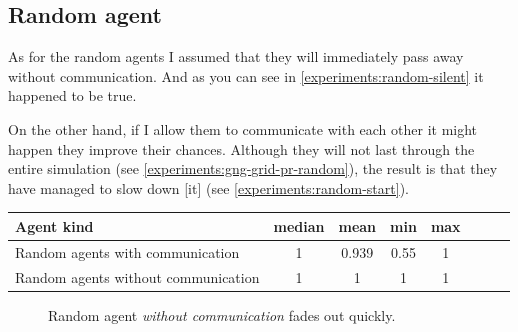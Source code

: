 \clearpage

\subsection{Random agent}   

As for the random agents I assumed that they will immediately pass away without communication. And as you can see in \ref{experiments:random-silent} it happened to be true. 

On the other hand, if I allow them to communicate with each other it might happen they improve their chances. Although they will not last through the entire simulation (see \ref{experiments:gng-grid-pr-random}), the result is that they have managed to slow down [it] (see \ref{experiments:random-start}).

\begin{center}   
  \begin{tabular}{l*{6}{c}r}
  Agent kind        & median & mean & min & max \\
  \hline  
  Random agents with communication     & 1 & 0.939 & 0.55 & 1  \\
  Random agents without communication    & 1 & 1 & 1 & 1  \\
  \end{tabular}                  
\end{center}

\begin{figure}[h!]
  \centering      
  \caption{Random agent \emph{without communication} fades out quickly.}
\end{figure} 


